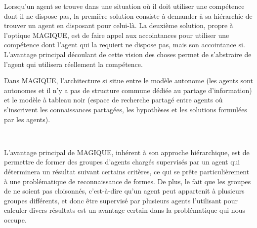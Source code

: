 Lorsqu'un agent se trouve dans une situation où il doit utiliser une compétence dont il ne dispose pas, la première solution consiste à demander à sa hiérarchie de trouver un agent en disposant pour celui-là. La deuxième solution, propre à l'optique MAGIQUE, est de faire appel aux accointances pour utiliser une compétence dont l'agent qui la requiert ne dispose pas, mais son accointance si. L'avantage principal découlant de cette vision des choses permet de s'abstraire de l'agent qui utilisera réellement la compétence.

Dans MAGIQUE, l'architecture si situe entre le modèle autonome (les agents sont autonomes et il n'y a pas de structure commune dédiée au partage d'information) et le modèle à tableau noir (espace de recherche partagé entre agents où s'inscrivent les connaissances partagées, les hypothèses et les solutions formulées par les agents).

~

L'avantage principal de MAGIQUE, inhérent à son approche hiérarchique, est de permettre de former des groupes d'agents chargés supervisés par un agent qui déterminera un résultat suivant certains critères, ce qui se prête particulièrement à une problématique de reconnaissance de formes. De plus, le fait que les groupes de ne soient pas cloisonnés, c'est-à-dire qu'un agent peut appartenit à plusieurs groupes différents, et donc être supervisé par plusieurs agents l'utilisant pour calculer divers résultats est un avantage certain dans la problématique qui nous occupe.